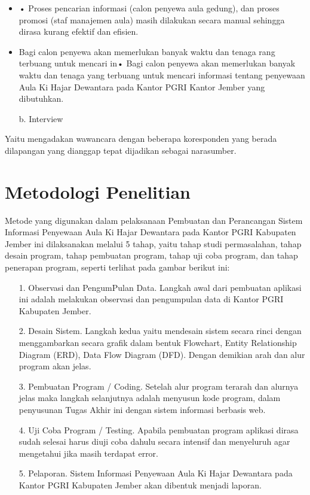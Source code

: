 \documentclass{jtetiproposalskripsi}
\begin{document}
\begin{itemize}
	\item •	Proses pencarian informasi (calon penyewa aula gedung), dan proses promosi (staf manajemen aula) masih dilakukan secara manual sehingga dirasa kurang efektif dan efisien.
	\item Bagi calon penyewa akan memerlukan banyak waktu dan tenaga rang terbuang untuk
mencari in•	Bagi calon penyewa akan memerlukan banyak waktu dan tenaga yang terbuang untuk mencari informasi tentang penyewaan Aula Ki Hajar Dewantara pada Kantor PGRI Kantor Jember yang dibutuhkan.
\end{itemize}

\begin{itemize}
\item[b.] Interview
\end{itemize}

Yaitu mengadakan wawancara dengan beberapa koresponden yang berada dilapangan yang dianggap tepat dijadikan sebagai narasumber.


\section{Metodologi Penelitian}
Metode yang digunakan dalam pelaksanaan Pembuatan dan Perancangan Sistem Informasi Penyewaan Aula Ki Hajar Dewantara pada Kantor PGRI Kabupaten Jember ini dilaksanakan melalui 5 tahap, yaitu tahap studi permasalahan, tahap desain program, tahap pembuatan program, tahap uji coba program, dan tahap penerapan program, seperti terlihat pada gambar berikut ini:
\begin{itemize}
\item[1.] Observasi dan PengumPulan Data. Langkah awal dari pembuatan aplikasi ini adalah melakukan observasi dan pengumpulan data di Kantor PGRI Kabupaten Jember.
\item[2.] Desain Sistem. Langkah kedua yaitu mendesain sistem secara rinci dengan menggambarkan secara grafik dalam bentuk Flowchart, Entity Relationship Diagram (ERD), Data Flow Diagram (DFD). Dengan demikian arah dan alur program akan jelas.
\item[3.] Pembuatan Program / Coding. Setelah alur program terarah dan alurnya jelas maka langkah selanjutnya adalah menyusun kode program, dalam penyusunan Tugas Akhir ini dengan sistem informasi berbasis web. 
\item[4.] Uji Coba Program / Testing. Apabila pembuatan program aplikasi dirasa sudah selesai harus diuji coba dahulu secara intensif dan menyeluruh agar mengetahui jika masih terdapat error.
\item[5.] Pelaporan. Sistem Informasi Penyewaan Aula Ki Hajar Dewantara pada Kantor PGRI Kabupaten Jember akan dibentuk menjadi laporan.
\end{itemize}
\end{document}
